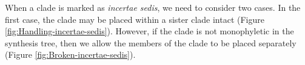 \documentclass[english]{article}
\begin{document}
When a clade is marked as \emph{incertae sedis}, we need to consider
two cases.
In the first case, the clade may be placed within a sister
clade intact (Figure \ref{fig:Handling-incertae-sedis}).
However, if
the clade is not monophyletic in the synthesis tree, then we allow the
members of the clade to be placed separately (Figure \ref{fig:Broken-incertae-sedis}).
\begin{figure}
\hfill{}\hfill{}\hfill{}


\end{figure}
\end{document}
